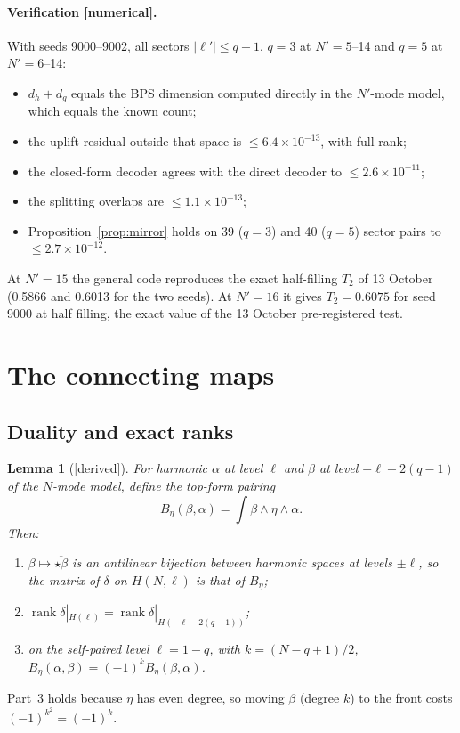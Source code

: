 \documentclass[11pt]{article}
\newcommand{\Np}{N'}
\newcommand{\lp}{\ell'}
\newcommand{\tagbox}[2]{\textsf{\small\color{#1}[#2]}}
\newcommand{\DER}{\tagbox{cder}{derived}}
\newcommand{\NUM}{\tagbox{cnum}{numerical}}
\theoremstyle{plain}
\newtheorem{lemma}{Lemma}
\theoremstyle{remark}
\numberwithin{equation}{section}
\begin{document}
\paragraph{Verification \NUM.} With seeds 9000--9002, all sectors $|\lp|\le q+1$, $q=3$ at $\Np=5$--14 and $q=5$ at
$\Np=6$--14:
\begin{itemize}\itemsep1pt
\item $d_h+d_g$ equals the BPS dimension computed directly in the $\Np$-mode model, which equals the known count;
\item the uplift residual outside that space is $\le6.4\times10^{-13}$, with full rank;
\item the closed-form decoder agrees with the direct decoder to $\le2.6\times10^{-11}$;
\item the splitting overlaps are $\le1.1\times10^{-13}$;
\item Proposition~\ref{prop:mirror} holds on 39 ($q=3$) and 40 ($q=5$) sector pairs to $\le2.7\times10^{-12}$.
\end{itemize}
At $\Np=15$ the general code reproduces the exact half-filling $T_2$ of 13 October (0.5866 and 0.6013 for the two
seeds). At $\Np=16$ it gives $T_2=0.6075$ for seed 9000 at half filling, the exact value of the 13 October
pre-registered test.

\section{The connecting maps}\label{sec:ranks}

\subsection{Duality and exact ranks}
\begin{lemma}[\DER]\label{lem:dual}
For harmonic $\alpha$ at level $\ell$ and $\beta$ at level $-\ell-2(q-1)$ of the $N$-mode model, define the top-form
pairing
\begin{equation}
B_\eta(\beta,\alpha)=\int\beta\wedge\eta\wedge\alpha .
\end{equation}
Then:
\begin{enumerate}\itemsep0pt
\item $\beta\mapsto\overline{\star\beta}$ is an antilinear bijection between harmonic spaces at levels $\pm\ell$, so the
matrix of $\delta$ on $H(N,\ell)$ is that of $B_\eta$;
\item $\operatorname{rank}\delta|_{H(\ell)}=\operatorname{rank}\delta|_{H(-\ell-2(q-1))}$;
\item on the self-paired level $\ell=1-q$, with $k=(N-q+1)/2$, $B_\eta(\alpha,\beta)=(-1)^kB_\eta(\beta,\alpha)$.
\end{enumerate}
\end{lemma}
\noindent Part~3 holds because $\eta$ has even degree, so moving $\beta$ (degree $k$) to the front costs $(-1)^{k^2}=(-1)^k$.
\end{document}
